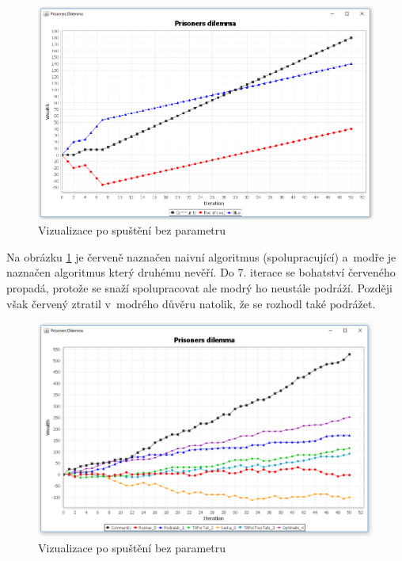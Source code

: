 \documentclass[pdftex,a4paper,12pt]{extarticle}
\begin{document}
\begin{figure}[h]
  \centering
    \includegraphics[width=\textwidth]{res/chart1.png}
    \caption{Vizualizace po spuštění bez parametru}
    \label{fig:chart1}
\end{figure}

Na obrázku \ref{fig:chart1} je červeně naznačen naivní algoritmus (spolupracující) a~modře je naznačen algoritmus který druhému nevěří. Do 7. iterace se bohatství červeného propadá, protože se snaží spolupracovat ale modrý ho neustále podráží. Později však červený ztratil v~modrého důvěru natolik, že se rozhodl také podrážet.    

\begin{figure}[h]
  \centering
    \includegraphics[width=\textwidth]{res/chart2.png}
    \caption{Vizualizace po spuštění bez parametru}
    \label{fig:chart2}
    \vspace{10mm}
\end{figure}
\end{document}

